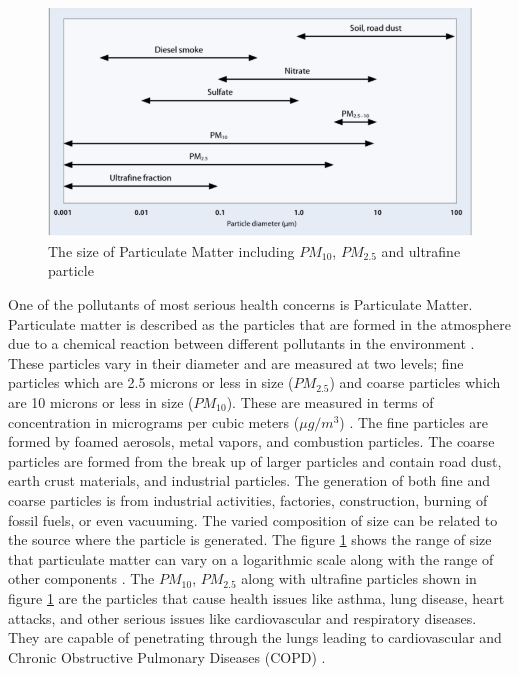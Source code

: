 \begin{figure}[h!]
  \begin{center}
  \includegraphics[scale=0.90]{./images/figure37.png}
  \end{center}
 
  \caption{The size of Particulate Matter including $PM_{10}$, $PM_{2.5}$ and ultrafine particle \cite{world2006air}}
  
  \label{PMSIZE}
\end{figure}

One of the pollutants of most serious health concerns is Particulate Matter. Particulate matter is described as the particles that are formed in the atmosphere due to a chemical reaction between different pollutants in the environment \cite{manisalidis2020environmental}. These particles vary in their diameter and are measured at two levels; fine particles which are 2.5 microns or less in size ($PM_{2.5}$) and coarse particles which are 10 microns or less in size ($PM_{10}$). These are measured in terms of concentration in micrograms per cubic meters ($\mu g/m^3$) \cite{Wilson1997}. The fine particles are formed by foamed aerosols, metal vapors, and combustion particles. The coarse particles are formed from the break up of larger particles and contain road dust, earth crust materials, and industrial particles. The generation of both fine and coarse particles is from industrial activities, factories, construction, burning of fossil fuels, or even vacuuming. The varied composition of size can be related to the source where the particle is generated. The figure \ref{PMSIZE} shows the range of size that particulate matter can vary on a logarithmic scale along with the range of other components  \cite{world2006air}. The $PM_{10}$, $PM_{2.5}$ along with ultrafine particles shown in figure \ref{PMSIZE} are the particles that cause health issues like asthma, lung disease, heart attacks, and other serious issues like cardiovascular and respiratory diseases. They are capable of penetrating through the lungs leading to cardiovascular and Chronic Obstructive Pulmonary Diseases (COPD) \cite{Tian2016}. 


